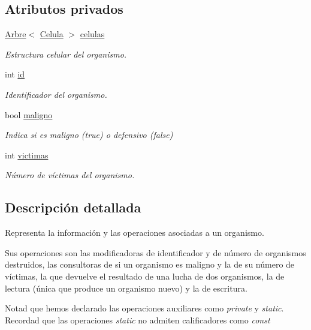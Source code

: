 \subsection*{Atributos privados}
\begin{DoxyCompactItemize}
\item 
\hyperlink{class_arbre}{Arbre}$<$ \hyperlink{class_celula}{Celula} $>$ \hyperlink{class_organismo_abfafb8e55144e295b406ce90951f0c68}{celulas}
\begin{DoxyCompactList}\small\item\em Estructura celular del organismo. \end{DoxyCompactList}\item 
int \hyperlink{class_organismo_a30be1823d3711fec651a5a4b1dc1cee5}{id}
\begin{DoxyCompactList}\small\item\em Identificador del organismo. \end{DoxyCompactList}\item 
bool \hyperlink{class_organismo_a85a5d1b9d31fa209d1ed0d596dbbed61}{maligno}
\begin{DoxyCompactList}\small\item\em Indica si es maligno (true) o defensivo (false) \end{DoxyCompactList}\item 
int \hyperlink{class_organismo_abb3e56487a080df544a6ff96e5e42520}{victimas}
\begin{DoxyCompactList}\small\item\em Número de víctimas del organismo. \end{DoxyCompactList}\end{DoxyCompactItemize}


\subsection{Descripción detallada}
Representa la información y las operaciones asociadas a un organismo. 

Sus operaciones son las modificadoras de identificador y de número de organismos destruidos, las consultoras de si un organismo es maligno y la de su número de víctimas, la que devuelve el resultado de una lucha de dos organismos, la de lectura (única que produce un organismo nuevo) y la de escritura.

Notad que hemos declarado las operaciones auxiliares como {\itshape private} y {\itshape static}. Recordad que las operaciones {\itshape static} no admiten calificadores como {\itshape const} 

